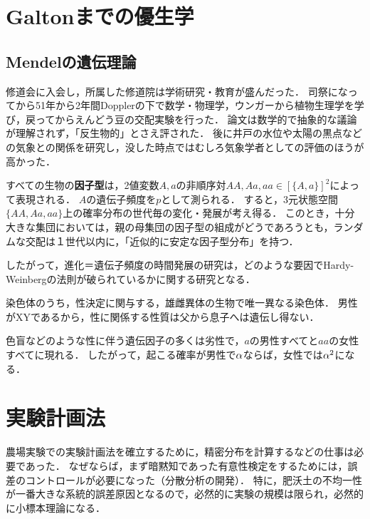 \documentclass[uplatex,dvipdfmx]{jsreport}
\begin{document}
\section{Galtonまでの優生学}

\subsection{Mendelの遺伝理論}

\begin{history}
    修道会に入会し，所属した修道院は学術研究・教育が盛んだった．
    司祭になってから51年から2年間Dopplerの下で数学・物理学，ウンガーから植物生理学を学び，戻ってからえんどう豆の交配実験を行った．
    論文\cite{Mendel66}は数学的で抽象的な議論が理解されず，「反生物的」とさえ評された．
    後に井戸の水位や太陽の黒点などの気象との関係を研究し，没した時点ではむしろ気象学者としての評価のほうが高かった．
\end{history}

\begin{theory}
    すべての生物の\textbf{因子型}は，2値変数$A,a$の非順序対$AA,Aa,aa\in[\{A,a\}]^2$によって表現される．
    $A$の遺伝子頻度を$p$として測られる．
    すると，3元状態空間$\{AA,Aa,aa\}$上の確率分布の世代毎の変化・発展が考え得る．
    このとき，十分大きな集団においては，親の母集団の因子型の組成がどうであろうとも，ランダムな交配は１世代以内に，「近似的に安定な因子型分布」を持つ\cite{Hardy08}．
\end{theory}
\begin{remarks}
    したがって，進化＝遺伝子頻度の時間発展の研究は，どのような要因でHardy-Weinbergの法則が破られているかに関する研究となる．
\end{remarks}

\begin{theory}[性染色体]
    染色体のうち，性決定に関与する，雄雌異体の生物で唯一異なる染色体．
    男性がXYであるから，性に関係する性質は父から息子へは遺伝し得ない．

    色盲などのような性に伴う遺伝因子の多くは劣性で，$a$の男性すべてと$aa$の女性すべてに現れる．
    したがって，起こる確率が男性で$\alpha$ならば，女性では$\alpha^2$になる．
\end{theory}

\section{実験計画法}

\begin{tcolorbox}[colframe=ForestGreen, colback=ForestGreen!10!white,breakable,colbacktitle=ForestGreen!40!white,coltitle=black,fonttitle=\bfseries\sffamily,
title=]
    農場実験での実験計画法を確立するために，精密分布を計算するなどの仕事は必要であった．
    なぜならば，まず暗黙知であった有意性検定をするためには，誤差のコントロールが必要になった（分散分析の開発）．
    特に，肥沃土の不均一性が一番大きな系統的誤差原因となるので，必然的に実験の規模は限られ，必然的に小標本理論になる．
\end{tcolorbox}
\end{document}
